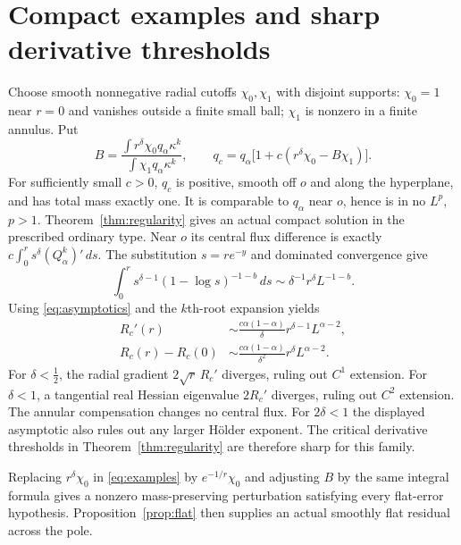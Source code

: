\documentclass[11pt]{article}
\theoremstyle{remark}\newtheorem{remark}[theorem]{Remark}
\begin{document}
\section{Compact examples and sharp derivative thresholds}
Choose smooth nonnegative radial cutoffs $\chi_0,\chi_1$ with
disjoint supports: $\chi_0=1$ near $r=0$ and vanishes outside a
finite small ball; $\chi_1$ is nonzero in a finite annulus. Put
\begin{equation}\label{eq:examples}
 B=\frac{\int r^\delta\chi_0q_\alpha\kappa^k}
          {\int\chi_1q_\alpha\kappa^k},\qquad
 q_c=q_\alpha\bigl[1+c(r^\delta\chi_0-B\chi_1)\bigr].
\end{equation}
For sufficiently small $c>0$, $q_c$ is positive, smooth off $o$
and along the hyperplane, and has total mass exactly one. It is
comparable to $q_\alpha$ near $o$, hence is in no $L^p$, $p>1$.
Theorem~\ref{thm:regularity} gives an actual compact solution in
the prescribed ordinary type. Near $o$ its central flux difference is
exactly $c\int_0^r s^\delta(Q_\alpha^k)'\,ds$.
The substitution $s=re^{-y}$ and dominated convergence give
\[
 \int_0^r s^{\delta-1}(1-\log s)^{-1-b}\,ds
 \sim\delta^{-1}r^\delta L^{-1-b}.
\]
Using \eqref{eq:asymptotics} and the $k$th-root expansion yields
\begin{align*}
 R_c'(r)&\sim\frac{c\alpha(1-\alpha)}\delta
                  r^{\delta-1}L^{\alpha-2},\\
 R_c(r)-R_c(0)&\sim\frac{c\alpha(1-\alpha)}{\delta^2}
                  r^\delta L^{\alpha-2}.
\end{align*}
For $\delta<\frac12$, the radial gradient
$2\sqrt r\,R_c'$ diverges, ruling out $C^1$ extension. For
$\delta<1$, a tangential real Hessian eigenvalue $2R_c'$ diverges,
ruling out $C^2$ extension. The annular compensation changes no
central flux. For $2\delta<1$ the displayed asymptotic also rules
out any larger H\"older exponent. The critical derivative thresholds
in Theorem~\ref{thm:regularity} are therefore sharp for this family.

Replacing $r^\delta\chi_0$ in \eqref{eq:examples} by
$e^{-1/r}\chi_0$ and adjusting $B$ by the same integral formula
gives a nonzero mass-preserving perturbation satisfying every
flat-error hypothesis. Proposition~\ref{prop:flat} then supplies
an actual smoothly flat residual across the pole.
\end{document}
